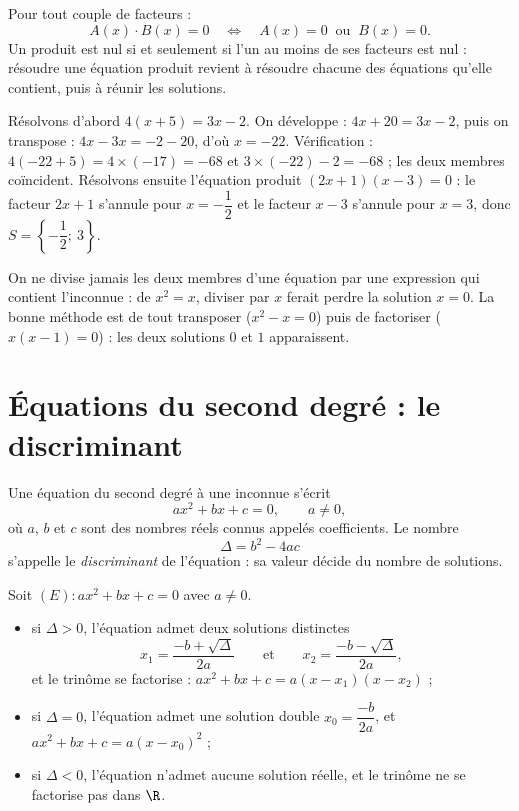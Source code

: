 \begin{propriete}
Pour tout couple de facteurs :
\[
A(x) \cdot B(x) = 0 \quad\Longleftrightarrow\quad A(x) = 0 \ \text{ ou } \ B(x) = 0 .
\]
Un produit est nul si et seulement si l'un au moins de ses facteurs est nul : résoudre une équation produit revient à résoudre chacune des équations qu'elle contient, puis à réunir les solutions.
\end{propriete}

\begin{exemple}
Résolvons d'abord $4(x + 5) = 3x - 2$. On développe : $4x + 20 = 3x - 2$, puis on transpose : $4x - 3x = -2 - 20$, d'où $x = -22$. Vérification : $4(-22 + 5) = 4 \times (-17) = -68$ et $3 \times (-22) - 2 = -68$ ; les deux membres coïncident. Résolvons ensuite l'équation produit $(2x + 1)(x - 3) = 0$ : le facteur $2x + 1$ s'annule pour $x = -\dfrac{1}{2}$ et le facteur $x - 3$ s'annule pour $x = 3$, donc $S = \left\{-\dfrac{1}{2};\ 3\right\}$.
\end{exemple}

\begin{attention}
On ne divise jamais les deux membres d'une équation par une expression qui contient l'inconnue : de $x^{2} = x$, diviser par $x$ ferait perdre la solution $x = 0$. La bonne méthode est de tout transposer ($x^{2} - x = 0$) puis de factoriser ($x(x - 1) = 0$) : les deux solutions $0$ et $1$ apparaissent.
\end{attention}

\section{Équations du second degré : le discriminant}

\begin{definition}
Une équation du second degré à une inconnue s'écrit
\[
ax^{2} + bx + c = 0, \qquad a \neq 0,
\]
où $a$, $b$ et $c$ sont des nombres réels connus appelés coefficients. Le nombre
\[
\Delta = b^{2} - 4ac
\]
s'appelle le \emph{discriminant} de l'équation : sa valeur décide du nombre de solutions.
\end{definition}

\begin{propriete}
Soit $(E) : ax^{2} + bx + c = 0$ avec $a \neq 0$.
\begin{itemize}
  \item si $\Delta > 0$, l'équation admet deux solutions distinctes
  \[
  x_{1} = \frac{-b + \sqrt{\Delta}}{2a} \qquad\text{et}\qquad
  x_{2} = \frac{-b - \sqrt{\Delta}}{2a},
  \]
  et le trinôme se factorise : $ax^{2} + bx + c = a(x - x_{1})(x - x_{2})$ ;
  \item si $\Delta = 0$, l'équation admet une solution double $x_{0} = \dfrac{-b}{2a}$, et $ax^{2} + bx + c = a(x - x_{0})^{2}$ ;
  \item si $\Delta < 0$, l'équation n'admet aucune solution réelle, et le trinôme ne se factorise pas dans $\R$.
\end{itemize}
\end{propriete}


